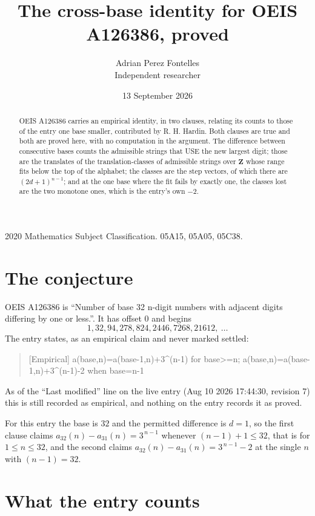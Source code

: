 \documentclass[11pt,a4paper]{article}
\title{The cross-base identity for OEIS A126386, proved}
\author{Adrian Perez Fontelles\\ \small Independent researcher}
\date{13 September 2026}
\theoremstyle{plain}
\theoremstyle{definition}
\begin{document}
\maketitle

\begin{abstract}
OEIS A126386 carries an empirical identity, in two clauses, relating its counts to those of the
entry one base smaller, contributed by R. H. Hardin. Both clauses are true and both are proved
here, with no computation in the argument. The difference between consecutive bases counts the
admissible strings that USE the new largest digit; those are the translates of the
translation-classes of admissible strings over $\mathbf{Z}$ whose range fits below the top of
the alphabet; the classes are the step vectors, of which there are $(2d+1)^{n-1}$; and at the
one base where the fit fails by exactly one, the classes lost are the two monotone ones, which
is the entry's own $-2$.
\end{abstract}

\noindent\small 2020 Mathematics Subject Classification. 05A15, 05A05, 05C38.\normalsize

\section{The conjecture}

OEIS A126386 is ``Number of base 32 n-digit numbers with adjacent digits differing by one or less.''. It has offset $0$ and begins
\[
1, 32, 94, 278, 824, 2446, 7268, 21612,\ \dots
\]
The entry states, as an empirical claim and never marked settled:
\begin{quote}
[Empirical] a(base,n)=a(base-1,n)+3\textasciicircum{}(n-1) for base>=n; a(base,n)=a(base-1,n)+3\textasciicircum{}(n-1)-2 when base=n-1
\end{quote}
As of the ``Last modified'' line on the live entry (Aug 10 2026 17:44:30, revision 7)
this is still recorded as empirical, and nothing on the entry records it as proved.

For this entry the base is $32$ and the permitted difference is $d=1$, so the first clause
claims $a_{32}(n)-a_{31}(n)=3^{\,n-1}$ whenever $(n-1)+1\le32$, that is for
$1\le n\le32$, and the second claims $a_{32}(n)-a_{31}(n)=3^{\,n-1}-2$ at the single
$n$ with $(n-1)=32$.

\section{What the entry counts}
\end{document}
